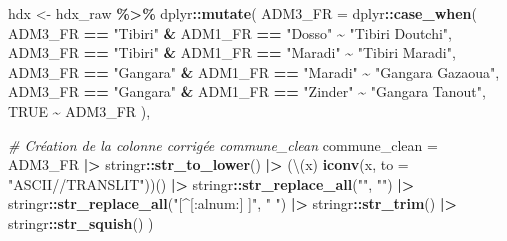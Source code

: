 \documentclass[
]{article}
\newenvironment{Shaded}{\begin{snugshade}}{\end{snugshade}}
\newcommand{\AttributeTok}[1]{\textcolor[rgb]{0.13,0.29,0.53}{#1}}
\newcommand{\CommentTok}[1]{\textcolor[rgb]{0.56,0.35,0.01}{\textit{#1}}}
\newcommand{\ConstantTok}[1]{\textcolor[rgb]{0.56,0.35,0.01}{#1}}
\newcommand{\FunctionTok}[1]{\textcolor[rgb]{0.13,0.29,0.53}{\textbf{#1}}}
\newcommand{\NormalTok}[1]{#1}
\newcommand{\OtherTok}[1]{\textcolor[rgb]{0.56,0.35,0.01}{#1}}
\newcommand{\SpecialCharTok}[1]{\textcolor[rgb]{0.81,0.36,0.00}{\textbf{#1}}}
\newcommand{\StringTok}[1]{\textcolor[rgb]{0.31,0.60,0.02}{#1}}
\begin{document}
\begin{Shaded}
\begin{Highlighting}[]
\NormalTok{hdx }\OtherTok{\textless{}{-}}\NormalTok{ hdx\_raw }\SpecialCharTok{\%\textgreater{}\%}
\NormalTok{  dplyr}\SpecialCharTok{::}\FunctionTok{mutate}\NormalTok{(}
    \AttributeTok{ADM3\_FR =}\NormalTok{ dplyr}\SpecialCharTok{::}\FunctionTok{case\_when}\NormalTok{(}
\NormalTok{      ADM3\_FR }\SpecialCharTok{==} 
        \StringTok{"Tibiri"} \SpecialCharTok{\&}\NormalTok{ ADM1\_FR }\SpecialCharTok{==} \StringTok{"Dosso"} \SpecialCharTok{\textasciitilde{}} \StringTok{"Tibiri Doutchi"}\NormalTok{,}
\NormalTok{      ADM3\_FR }\SpecialCharTok{==} 
        \StringTok{"Tibiri"} \SpecialCharTok{\&}\NormalTok{ ADM1\_FR }\SpecialCharTok{==} \StringTok{"Maradi"} \SpecialCharTok{\textasciitilde{}} \StringTok{"Tibiri Maradi"}\NormalTok{,}
\NormalTok{      ADM3\_FR }\SpecialCharTok{==} 
        \StringTok{"Gangara"} \SpecialCharTok{\&}\NormalTok{ ADM1\_FR }\SpecialCharTok{==} \StringTok{"Maradi"} \SpecialCharTok{\textasciitilde{}} \StringTok{"Gangara Gazaoua"}\NormalTok{,}
\NormalTok{      ADM3\_FR }\SpecialCharTok{==} 
        \StringTok{"Gangara"} \SpecialCharTok{\&}\NormalTok{ ADM1\_FR }\SpecialCharTok{==} \StringTok{"Zinder"} \SpecialCharTok{\textasciitilde{}} \StringTok{"Gangara Tanout"}\NormalTok{,}
      \ConstantTok{TRUE} \SpecialCharTok{\textasciitilde{}}\NormalTok{ ADM3\_FR}
\NormalTok{    ),}
    
    \CommentTok{\# Création de la colonne corrigée commune\_clean}
    \AttributeTok{commune\_clean =}\NormalTok{ ADM3\_FR }\SpecialCharTok{|\textgreater{}}
\NormalTok{      stringr}\SpecialCharTok{::}\FunctionTok{str\_to\_lower}\NormalTok{() }\SpecialCharTok{|\textgreater{}}
\NormalTok{      (\textbackslash{}(x) }\FunctionTok{iconv}\NormalTok{(x, }\AttributeTok{to =} \StringTok{"ASCII//TRANSLIT"}\NormalTok{))() }\SpecialCharTok{|\textgreater{}}
\NormalTok{      stringr}\SpecialCharTok{::}\FunctionTok{str\_replace\_all}\NormalTok{(}\StringTok{"\textquotesingle{}"}\NormalTok{, }\StringTok{""}\NormalTok{) }\SpecialCharTok{|\textgreater{}}
\NormalTok{      stringr}\SpecialCharTok{::}\FunctionTok{str\_replace\_all}\NormalTok{(}\StringTok{"[\^{}[:alnum:] ]"}\NormalTok{, }\StringTok{" "}\NormalTok{) }\SpecialCharTok{|\textgreater{}}
\NormalTok{      stringr}\SpecialCharTok{::}\FunctionTok{str\_trim}\NormalTok{() }\SpecialCharTok{|\textgreater{}}
\NormalTok{      stringr}\SpecialCharTok{::}\FunctionTok{str\_squish}\NormalTok{()}
\NormalTok{  )}
\end{Highlighting}
\end{Shaded}
\end{document}
